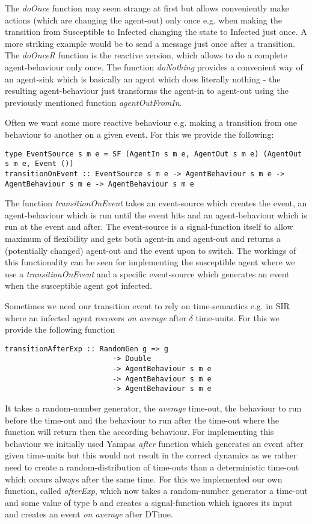 The \textit{doOnce} function may seem strange at first but allows conveniently make actions (which are changing the agent-out) only once e.g. when making the transition from Susceptible to Infected changing the state to Infected just once. A more striking example would be to send a message just once after a transition. The \textit{doOnceR} function is the reactive version, which allows to do a complete agent-behaviour only once. The function \textit{doNothing} provides a convenient way of an agent-sink which is basically an agent which does literally nothing - the resulting agent-behaviour just transforms the agent-in to agent-out using the previously mentioned function \textit{agentOutFromIn}.

Often we want some more reactive behaviour e.g. making a transition from one behaviour to another on a given event. For this we provide the following:

\begin{verbatim}
type EventSource s m e = SF (AgentIn s m e, AgentOut s m e) (AgentOut s m e, Event ())
transitionOnEvent :: EventSource s m e -> AgentBehaviour s m e -> AgentBehaviour s m e -> AgentBehaviour s m e
\end{verbatim}

The function \textit{transitionOnEvent} takes an event-source which creates the event, an agent-behaviour which is run until the event hits and an agent-behaviour which is run at the event and after. The event-source is a signal-function itself to allow maximum of flexibility and gets both agent-in and agent-out and returns a (potentially changed) agent-out and the event upon to switch. 
The workings of this functionality can be seen for implementing the susceptible agent where we use a \textit{transitionOnEvent} and a specific event-source which generates an event when the susceptible agent got infected.

Sometimes we need our transition event to rely on time-semantics e.g. in SIR where an infected agent recovers \textit{on average} after $\delta$ time-units. For this we provide the following function

\begin{verbatim}
transitionAfterExp :: RandomGen g => g
						 -> Double 
						 -> AgentBehaviour s m e 
						 -> AgentBehaviour s m e 
						 -> AgentBehaviour s m e
\end{verbatim}

It takes a random-number generator, the \textit{average} time-out, the behaviour to run before the time-out and the behaviour to run after the time-out where the function will return then the according behaviour. For implementing this behaviour we initially used Yampas \textit{after} function which generates an event after given time-units but this would not result in the correct dynamics as we rather need to create a random-distribution of time-outs than a deterministic time-out which occurs always after the same time. For this we implemented our own function, called \textit{afterExp}, which now takes a random-number generator a time-out and some value of type b and creates a signal-function which ignores its input and creates an event \textit{on average} after DTime.

